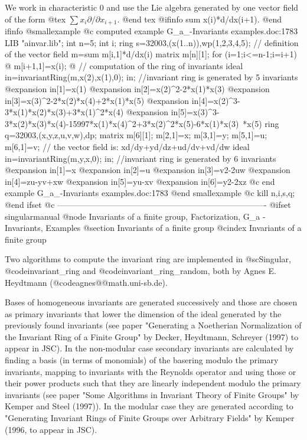 We work in characteristic 0 and use the Lie algebra generated by one
vector field of the form
@tex
$\sum x_i \partial /\partial x_{i+1}$.
@end tex
@ifinfo
sum x(i)*d/dx(i+1).
@end ifinfo
@smallexample
@c computed example G_a_-Invariants examples.doc:1783 
  LIB "ainvar.lib";
  int n=5;
  int i;
  ring s=32003,(x(1..n)),wp(1,2,3,4,5);
  // definition of the vector field m=sum m[i,1]*d/dx(i)
  matrix m[n][1];
  for (i=1;i<=n-1;i=i+1)
  @{
     m[i+1,1]=x(i);
  @}
  // computation of the ring of invariants
  ideal in=invariantRing(m,x(2),x(1),0);
  in;   //invariant ring is generated by 5 invariants
@expansion{} in[1]=x(1)
@expansion{} in[2]=x(2)^2-2*x(1)*x(3)
@expansion{} in[3]=x(3)^2-2*x(2)*x(4)+2*x(1)*x(5)
@expansion{} in[4]=x(2)^3-3*x(1)*x(2)*x(3)+3*x(1)^2*x(4)
@expansion{} in[5]=x(3)^3-3*x(2)*x(3)*x(4)-15997*x(1)*x(4)^2+3*x(2)^2*x(5)-6*x(1)*x(3)\
   *x(5)
  ring q=32003,(x,y,z,u,v,w),dp;
  matrix m[6][1];
  m[2,1]=x;
  m[3,1]=y;
  m[5,1]=u;
  m[6,1]=v;
  // the vector field is: xd/dy+yd/dz+ud/dv+vd/dw
  ideal in=invariantRing(m,y,x,0);
  in; //invariant ring is generated by 6 invariants
@expansion{} in[1]=x
@expansion{} in[2]=u
@expansion{} in[3]=v2-2uw
@expansion{} in[4]=zu-yv+xw
@expansion{} in[5]=yu-xv
@expansion{} in[6]=y2-2xz
@c end example G_a_-Invariants examples.doc:1783
@end smallexample
@c kill n,i,s,q;
@end ifset
@c ----------------------------------------------------------------------------
@ifset singularmanual
@node Invariants of a finite group, Factorization, G_a -Invariants, Examples
@section Invariants of a finite group
@cindex Invariants of a finite group

Two algorithms to compute the invariant ring are implemented in
@sc{Singular}, @code{invariant_ring} and @code{invariant_ring_random},
both by Agnes E. Heydtmann (@code{agnes@@math.uni-sb.de}).

Bases of homogeneous invariants are generated successively and those are
chosen as primary invariants that lower the dimension of the ideal
generated by the previously found invariants (see paper "Generating a
Noetherian Normalization of the Invariant Ring of a Finite Group" by
Decker, Heydtmann, Schreyer (1997) to appear in JSC).  In the
non-modular case secondary invariants are calculated by finding a basis
(in terms of monomials) of the basering modulo the primary invariants,
mapping to invariants with the Reynolds operator and using those or
their power products such that they are linearly independent modulo the
primary invariants (see paper "Some Algorithms in Invariant Theory of
Finite Groups" by Kemper and Steel (1997)).  In the modular case they
are generated according to "Generating Invariant Rings of Finite Groups
over Arbitrary Fields" by Kemper (1996, to appear in JSC).

